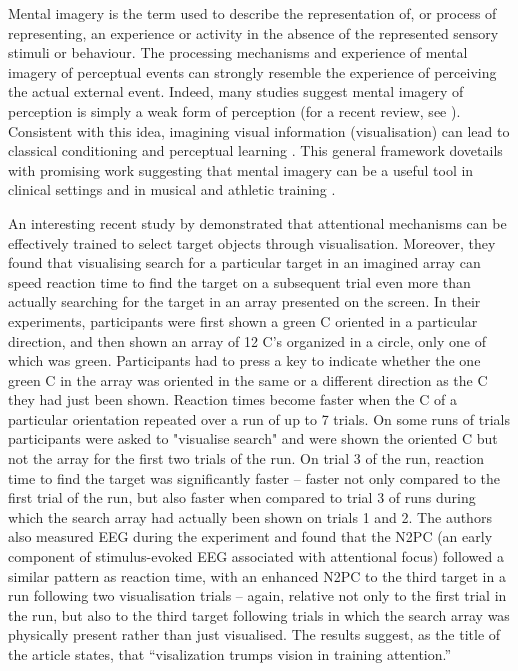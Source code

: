 \documentclass[smallextended]{svjour3}       %
\begin{document}
Mental imagery is the term used to describe the representation of, or process of representing, an experience or activity in the absence of the represented sensory stimuli or behaviour. The processing mechanisms and experience of mental imagery of perceptual events can strongly resemble the experience of perceiving the actual external event. Indeed, many studies suggest mental imagery of perception is simply a weak form of perception (for a recent review, see \cite{pearson2015}). Consistent with this idea, imagining visual information (visualisation) can lead to classical conditioning \citep{lewis2013} and perceptual learning \citep{tartaglia2009}. This general framework dovetails with promising work suggesting that mental imagery can be a useful tool in clinical settings \citep[e.g.][]{foa1980} and in musical and athletic training \citep[e.g.][]{zatorre2007, guillot2008}. 

An interesting recent study by \cite{reinhart2015} demonstrated that attentional mechanisms can be effectively trained to select target objects through visualisation. Moreover, they found that visualising search for a particular target in an imagined array can speed reaction time to find the target on a subsequent trial even more than actually searching for the target in an array presented on the screen. In their experiments, participants were first shown a green C oriented in a particular direction, and then shown an array of 12 C's organized in a circle, only one of which was green. Participants had to press a key to indicate whether the one green C in the array was oriented in the same or a different direction as the C they had just been shown. Reaction times become faster when the C of a particular orientation repeated over a run of up to 7 trials. On some runs of trials participants were asked to "visualise search" and were shown the oriented C but not the array for the first two trials of the run. On trial 3 of the run, reaction time to find the target was significantly faster -- faster not only compared to the first trial of the run, but also faster when compared to trial 3 of runs during which the search array had actually been shown on trials 1 and 2. The authors also measured EEG during the experiment and found that the N2PC (an early component of stimulus-evoked EEG associated with attentional focus) followed a similar pattern as reaction time, with an enhanced N2PC to the third target in a run following two visualisation trials -- again, relative not only to the first trial in the run, but also to the third target following trials in which the search array was physically present rather than just visualised. The results suggest, as the title of the article states, that ``visalization trumps vision in training attention.'' 
\end{document}
